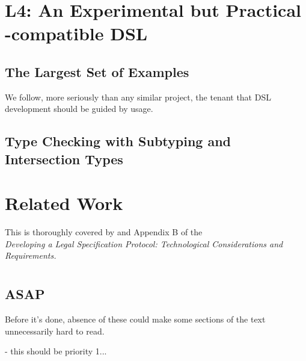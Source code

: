 \documentclass[12pt]{article}
\newcommand{\termz}[2]{\EM{\textsf{\hyperref[#1]{#2}}}\xspace}
\newcommand{\lsm}{\texorpdfstring{\termz{lsm}{LSM}}{LSM}}
\begin{document}
\section{L4: An Experimental but Practical \lsm-compatible DSL}
\subsection{The Largest Set of Examples}
We follow, more seriously than any similar project, the tenant that DSL development should be guided by usage.


\subsection{Type Checking with Subtyping and Intersection Types} \label{typechecking}


\section{Related Work}

This is thoroughly covered by  and Appendix B of the \\  {\it Developing a Legal Specification Protocol: Technological Considerations and Requirements.}


\section{\texorpdfstring{}{Dustin's todo}}
\subsection{ASAP}
Before it's done, absence of these could make some sections of the text unnecessarily hard to read.
\begin{LPPI}
\item {} - this should be priority 1...
\item {}
\end{LPPI}
\end{document}
